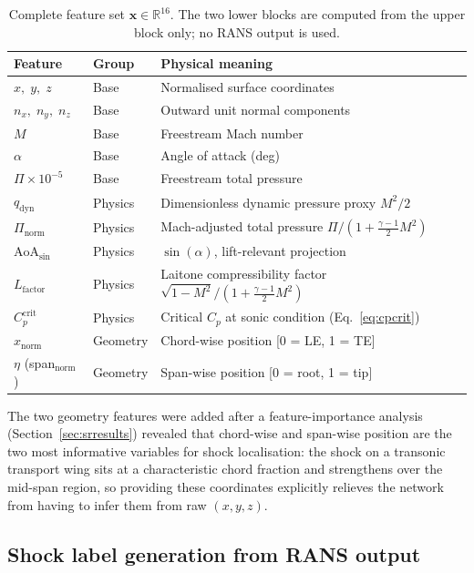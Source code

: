 \documentclass{WCCM-ECCOMAS_2026_Full_Paper}
\begin{document}
\begin{table}[ht]
\centering
\caption{Complete feature set $\mathbf{x}\in\mathbb{R}^{16}$.
  The two lower blocks are computed from the upper block only; no
  RANS output is used.}
\label{tab:features}
\begin{tabular}{lll}
\toprule
\textbf{Feature} & \textbf{Group} & \textbf{Physical meaning} \\
\midrule
$x,\;y,\;z$        & Base & Normalised surface coordinates \\
$n_x,\;n_y,\;n_z$ & Base & Outward unit normal components \\
$M$                & Base & Freestream Mach number \\
$\alpha$           & Base & Angle of attack (deg) \\
$\Pi{\times}10^{-5}$ & Base & Freestream total pressure \\
\midrule
$q_{\mathrm{dyn}}$    & Physics & Dimensionless dynamic pressure proxy $M^{2}/2$ \\
$\Pi_{\mathrm{norm}}$ & Physics & Mach-adjusted total pressure $\Pi/(1+\frac{\gamma-1}{2}M^{2})$ \\
$\mathrm{AoA}_{\sin}$ & Physics & $\sin(\alpha)$, lift-relevant projection \\
$L_{\mathrm{factor}}$ & Physics & Laitone compressibility factor $\sqrt{1-M^{2}}/(1+\frac{\gamma-1}{2}M^{2})$ \\
$C_{p}^{\mathrm{crit}}$ & Physics & Critical $C_p$ at sonic condition (Eq.~\ref{eq:cpcrit}) \\
\midrule
$x_{\mathrm{norm}}$ & Geometry & Chord-wise position [0 = LE, 1 = TE] \\
$\eta$ (span$_{\mathrm{norm}}$) & Geometry & Span-wise position [0 = root, 1 = tip] \\
\bottomrule
\end{tabular}
\end{table}

The two geometry features were added after a feature-importance
analysis (Section~\ref{sec:srresults}) revealed that chord-wise and
span-wise position are the two most informative variables for shock
localisation: the shock on a transonic transport wing sits at a
characteristic chord fraction and strengthens over the mid-span
region, so providing these coordinates explicitly relieves the
network from having to infer them from raw $(x,y,z)$.

\subsection{Shock label generation from RANS output}
\end{document}
